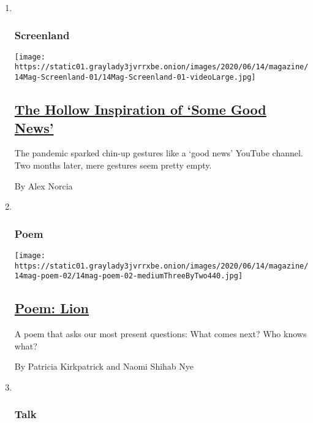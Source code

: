\begin{enumerate}
\def\labelenumi{\arabic{enumi}.}
\item ~
  \hypertarget{screenland}{%
  \subsubsection{Screenland}\label{screenland}}

  \texttt{[image: https://static01.graylady3jvrrxbe.onion/images/2020/06/14/magazine/14Mag-Screenland-01/14Mag-Screenland-01-videoLarge.jpg]}

  \hypertarget{the-hollow-inspiration-of-some-good-news}{%
  \subsection{\texorpdfstring{\href{/2020/06/11/magazine/the-hollow-inspiration-of-some-good-news.html}{The
  Hollow Inspiration of `Some Good
  News'}}{The Hollow Inspiration of `Some Good News'}}\label{the-hollow-inspiration-of-some-good-news}}

  The pandemic sparked chin-up gestures like a `good news' YouTube
  channel. Two months later, mere gestures seem pretty empty.

  By Alex Norcia
\item ~
  \hypertarget{poem}{%
  \subsubsection{Poem}\label{poem}}

  \texttt{[image: https://static01.graylady3jvrrxbe.onion/images/2020/06/14/magazine/14mag-poem-02/14mag-poem-02-mediumThreeByTwo440.jpg]}

  \hypertarget{poem-lion}{%
  \subsection{\texorpdfstring{\href{/2020/06/11/magazine/poem-lion.html}{Poem:
  Lion}}{Poem: Lion}}\label{poem-lion}}

  A poem that asks our most present questions: What comes next? Who
  knows what?

  By Patricia Kirkpatrick and Naomi Shihab Nye
\item ~
  \hypertarget{talk}{%
  \subsubsection{Talk}\label{talk}}


\end{enumerate}
